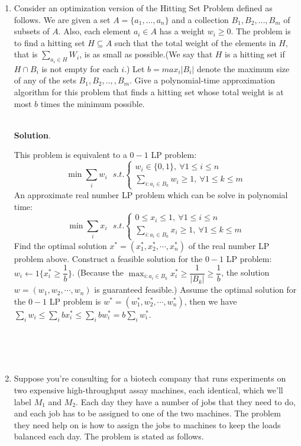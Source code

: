 \documentclass{article}
\begin{document}
\begin{enumerate}
\item Consider an optimization version of the Hitting Set Problem defined as follows. We are given a set $A=\{a_1,...,a_n\}$ and a collection $B_1, B_2, . . . , B_m$ of subsets of $A$. Also, each element $a_i \in A$ has a weight $w_i \geqslant  0$. The problem is to find a hitting set $H \subseteq A$ such that the total weight of the elements in $H$, that is $\sum_{a_i\in H}W_i$, is as small as possible.(We 
say that $H$ is a hitting set if $H \cap B_i$ is not empty for each $i$.) Let $b = max_i |B_i|$ denote the maximum size of any of the sets $B_1, B_2, ..,, B_m$. Give a polynomial-time approximation algorithm for this problem that finds a hitting set whose total weight is at most $b$ times the minimum possible.


~\\\textbf{Solution}.\\
\begin{spacing}{1.5}
    This problem is equivalent to a $0-1$ LP problem:
    $$
    \min {\sum_i w_i}\ \ \ 
    s.t.
    \left\{
        \begin{array}{c}
            w_i\in\{0, 1\},\ \forall 1\leq i\leq n\\
            \sum_{i:a_i\in B_k} w_i \geq 1,\ \forall 1\leq k \leq m
        \end{array}
    \right.
    $$
An approximate real number LP problem which can be solve in polynomial time:
    $$
    \min {\sum_i x_i}\ \ \ 
    s.t.
    \left\{
        \begin{array}{c}
            0\leq x_i\leq 1,\ \forall 1\leq i\leq n\\
            \sum_{i:a_i\in B_k} x_i \geq 1,\ \forall 1\leq k \leq m
        \end{array}
    \right.
    $$
Find the optimal solution $x^*=(x_1^*,x_2^*,\cdots,x_n^*)$ of the real number LP problem above. Construct a feasible solution for the $0-1$ LP problem: $w_i \leftarrow 1\{x_i^*\geq \dfrac{1}{b}\}$. (Because the $\max_{i:a_i\in B_k} x_i^*\geq \dfrac{1}{|B_k|}\geq \dfrac{1}{b}$, the solution $w=(w_1,w_2,\cdots,w_n)$ is guaranteed feasible.) Assume the optimal solution for the $0-1$ LP problem is $w^*=(w_1^*,w_2^*,\cdots,w_n^*)$, then we have $\sum_{i}w_i \leq \sum_{i} bx_i^*\leq \sum_{i} bw_i^*=b\sum_{i} w_i^*$. 
\end{spacing}
~\\
~\\
~\\


\item Suppose you’re consulting for a biotech company that runs experiments on two expensive high-throughput assay machines, each identical, which we’ll label $M_1$ and $M_2$. Each day they have a number of jobs that they need to do, and each job has to be assigned to one of the two machines. The problem they need help on is how to assign the jobs to machines to keep the loads balanced each day. The problem is stated as follows. 


\end{enumerate}
\end{document}
